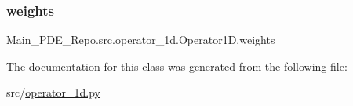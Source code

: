 \subsubsection{\texorpdfstring{weights}{weights}}
{\footnotesize\ttfamily Main\+\_\+\+P\+D\+E\+\_\+\+Repo.\+src.\+operator\+\_\+1d.\+Operator1\+D.\+weights}



The documentation for this class was generated from the following file\+:\begin{DoxyCompactItemize}
\item 
src/\hyperlink{operator__1d_8py}{operator\+\_\+1d.\+py}\end{DoxyCompactItemize}
